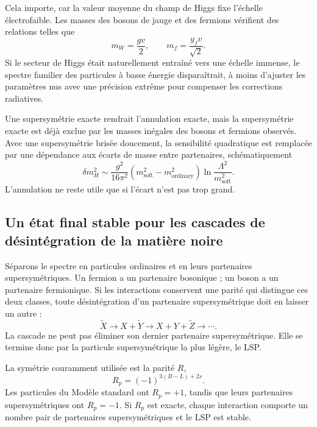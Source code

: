 Cela importe, car la valeur moyenne du champ de Higgs fixe l’échelle électrofaible. Les masses des bosons de jauge et des fermions vérifient des relations telles que
\begin{equation}
m_W=\frac{gv}{2},
\qquad
m_f=\frac{y_fv}{\sqrt2}.
\end{equation}
Si le secteur de Higgs était naturellement entraîné vers une échelle immense, le spectre familier des particules à basse énergie disparaîtrait, à moins d’ajuster les paramètres nus avec une précision extrême pour compenser les corrections radiatives.

Une supersymétrie exacte rendrait l’annulation exacte, mais la supersymétrie exacte est déjà exclue par les masses inégales des bosons et fermions observés. Avec une supersymétrie brisée doucement, la sensibilité quadratique est remplacée par une dépendance aux écarts de masse entre partenaires, schématiquement
\begin{equation}
\delta m_H^2
\sim
\frac{g^2}{16\pi^2}
\left(m_{\mathrm{soft}}^2-m_{\mathrm{ordinary}}^2\right)
\ln\frac{\Lambda^2}{m_{\mathrm{soft}}^2}.
\end{equation}
L’annulation ne reste utile que si l’écart n’est pas trop grand.

\subsection{Un état final stable pour les cascades de désintégration de la matière noire}

Séparons le spectre en particules ordinaires et en leurs partenaires supersymétriques. Un fermion a un partenaire bosonique ; un boson a un partenaire fermionique. Si les interactions conservent une parité qui distingue ces deux classes, toute désintégration d’un partenaire supersymétrique doit en laisser un autre :
\begin{equation}
\widetilde X
\longrightarrow X+\widetilde Y
\longrightarrow X+Y+\widetilde Z
\longrightarrow\cdots.
\end{equation}
La cascade ne peut pas éliminer son dernier partenaire supersymétrique. Elle se termine donc par la particule supersymétrique la plus légère, le LSP.

La symétrie couramment utilisée est la parité \(R\),
\begin{equation}
R_p=(-1)^{3(B-L)+2s}.
\end{equation}
Les particules du Modèle standard ont \(R_p=+1\), tandis que leurs partenaires supersymétriques ont \(R_p=-1\). Si \(R_p\) est exacte, chaque interaction comporte un nombre pair de partenaires supersymétriques et le LSP est stable.

